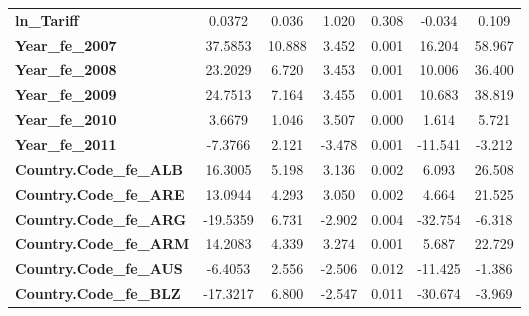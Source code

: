 \begin{center}
\begin{tabular}{lcccccc}
\textbf{ln\_Tariff}                                                &       0.0372  &        0.036     &     1.020  &         0.308        &       -0.034    &        0.109     \\
\textbf{Year\_fe\_2007}                                            &      37.5853  &       10.888     &     3.452  &         0.001        &       16.204    &       58.967     \\
\textbf{Year\_fe\_2008}                                            &      23.2029  &        6.720     &     3.453  &         0.001        &       10.006    &       36.400     \\
\textbf{Year\_fe\_2009}                                            &      24.7513  &        7.164     &     3.455  &         0.001        &       10.683    &       38.819     \\
\textbf{Year\_fe\_2010}                                            &       3.6679  &        1.046     &     3.507  &         0.000        &        1.614    &        5.721     \\
\textbf{Year\_fe\_2011}                                            &      -7.3766  &        2.121     &    -3.478  &         0.001        &      -11.541    &       -3.212     \\
\textbf{Country.Code\_fe\_ALB}                                     &      16.3005  &        5.198     &     3.136  &         0.002        &        6.093    &       26.508     \\
\textbf{Country.Code\_fe\_ARE}                                     &      13.0944  &        4.293     &     3.050  &         0.002        &        4.664    &       21.525     \\
\textbf{Country.Code\_fe\_ARG}                                     &     -19.5359  &        6.731     &    -2.902  &         0.004        &      -32.754    &       -6.318     \\
\textbf{Country.Code\_fe\_ARM}                                     &      14.2083  &        4.339     &     3.274  &         0.001        &        5.687    &       22.729     \\
\textbf{Country.Code\_fe\_AUS}                                     &      -6.4053  &        2.556     &    -2.506  &         0.012        &      -11.425    &       -1.386     \\
\textbf{Country.Code\_fe\_BLZ}                                     &     -17.3217  &        6.800     &    -2.547  &         0.011        &      -30.674    &       -3.969     \\

\end{tabular}
\end{center}
